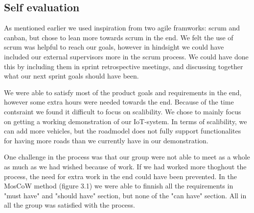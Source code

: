 \subsection{Self evaluation}

As mentioned earlier we used inspiration from two agile framworks: scrum and canban, but chose to lean more towards scrum in the end. We felt the use of scrum was helpful to reach our goals, however in hindsight we could have included our external supervisors more in the scrum process. We could have done this by including them in sprint retrospective meetings, and discussing together what our next sprint goals should have been.

We were able to satisfy most of the product goals and requirements in the end, however some extra hours were needed towards the end. Because of the time contsraint we found it difficult to focus on scalibility. We chose to mainly focus on getting a working demonstration of our IoT-system. In terms of scalibility, we can add more vehicles, but the roadmodel does not fully support functionalites for having more roads than we currently have in our demonstration. 

One challenge in the process was that our group were not able to meet as a whole as much as we had wished because of work. If we had worked more thoghout the process, the need for extra work in the end could have been prevented. In the MosCoW method (figure 3.1) we were able to finnish all the requirements in "must have" and "should have" section, but none of the "can have" section. All in all the group was satisfied with the process.